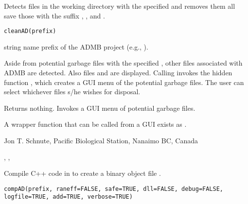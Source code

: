 \documentclass[letterpaper]{book}
\begin{document}
%
\begin{Description}\relax
Detects files in the working directory with the specified  and
removes them all save those with the suffix , , and .
\end{Description}
%
\begin{Usage}
\begin{verbatim}
cleanAD(prefix)
\end{verbatim}
\end{Usage}
%
\begin{Arguments}
\begin{ldescription}
\item[\code{prefix}] string name prefix of the ADMB project (e.g., ).
\end{ldescription}
\end{Arguments}
%
\begin{Details}\relax
Aside from potential garbage files with the specified , other 
files associated with ADMB are detected. Also files  and 
are displayed. Calling  invokes the hidden function ,
which creates a GUI menu of the potential garbage files. The user can select whichever
files s/he wishes for disposal.
\end{Details}
%
\begin{Value}
Returns nothing. Invokes a GUI menu of potential garbage files.
\end{Value}
%
\begin{Note}\relax
A wrapper function that can be called from a GUI exists as .
\end{Note}
%
\begin{Author}\relax
 Jon T. Schnute, Pacific Biological Station, Nanaimo BC, Canada 
\end{Author}
%
\begin{SeeAlso}\relax
 , ,  
\end{SeeAlso}
%
\begin{Description}\relax
Compile C++ code in  to create a binary object
file .
\end{Description}
%
\begin{Usage}
\begin{verbatim}
compAD(prefix, raneff=FALSE, safe=TRUE, dll=FALSE, debug=FALSE, logfile=TRUE, add=TRUE, verbose=TRUE)
\end{verbatim}
\end{Usage}
\end{document}
